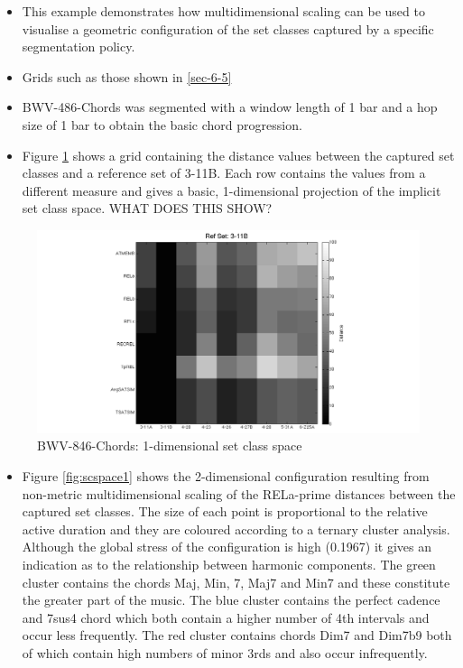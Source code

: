 \documentclass{article}
\begin{document}
\begin{itemize}
\item This example demonstrates how multidimensional scaling can be used to
  visualise a geometric configuration of the set classes captured by a
  specific segmentation policy.
\item Grids such as those shown in \ref{sec-6-5}
\item BWV-486-Chords was segmented with a window length of 1 bar and a hop
  size of 1 bar to obtain the basic chord progression.
\item Figure \ref{fig:1dspace} shows a grid containing the distance values
  between the captured set classes and a reference set of 3-11B. Each
  row contains the values from a different measure and gives a basic,
  1-dimensional projection of the implicit set class space. WHAT DOES
  THIS SHOW?
\end{itemize}
\begin{figure}[htb]
\centering
\includegraphics[width=.8\linewidth]{./plots/1dspace.png}
\caption{\label{fig:1dspace}BWV-846-Chords: 1-dimensional set class space}
\end{figure}
\begin{itemize}
\item Figure \ref{fig:scspace1} shows the 2-dimensional configuration
  resulting from non-metric multidimensional scaling of the RELa-prime
  distances between the captured set classes. The size of each point
  is proportional to the relative active duration and they are
  coloured according to a ternary cluster analysis. Although the
  global stress of the configuration is high (0.1967) it gives an
  indication as to the relationship between harmonic components. The
  green cluster contains the chords Maj, Min, 7, Maj7 and Min7 and
  these constitute the greater part of the music. The blue cluster
  contains the perfect cadence and 7sus4 chord which both contain a
  higher number of 4th intervals and occur less frequently. The red
  cluster contains chords Dim7 and Dim7b9 both of which contain high
  numbers of minor 3rds and also occur infrequently.
\end{itemize}
\end{document}
